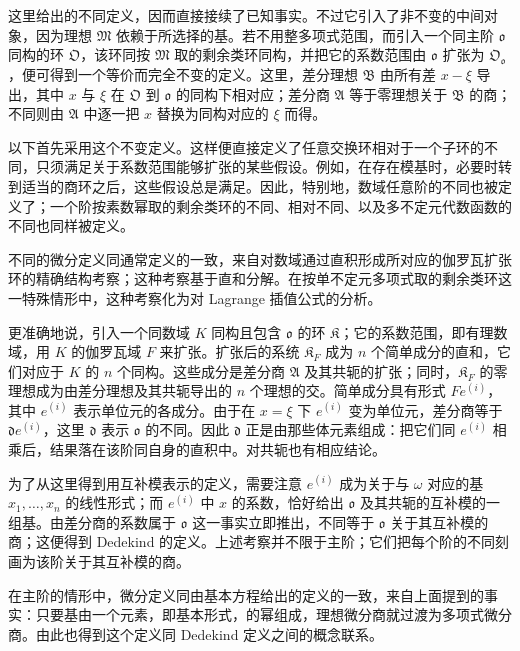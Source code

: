 这里给出的不同定义，因而直接接续了已知事实。不过它引入了非不变的中间对象，因为理想 \(\mathfrak M\) 依赖于所选择的基。若不用整多项式范围，而引入一个同主阶 \(\mathfrak o\) 同构的环 \(\mathfrak O\)，该环同按 \(\mathfrak M\) 取的剩余类环同构，并把它的系数范围由 \(\mathfrak o\) 扩张为 \(\mathfrak O_{\mathfrak o}\)，便可得到一个等价而完全不变的定义。这里，差分理想 \(\mathfrak B\) 由所有差 \(x-\xi\) 导出，其中 \(x\) 与 \(\xi\) 在 \(\mathfrak O\) 到 \(\mathfrak o\) 的同构下相对应；差分商 \(\mathfrak A\) 等于零理想关于 \(\mathfrak B\) 的商；不同则由 \(\mathfrak A\) 中逐一把 \(x\) 替换为同构对应的 \(\xi\) 而得。

以下首先采用这个不变定义。这样便直接定义了任意交换环相对于一个子环的不同，只须满足关于系数范围能够扩张的某些假设。例如，在存在模基时，必要时转到适当的商环之后，这些假设总是满足。因此，特别地，数域任意阶的不同也被定义了；一个阶按素数幂取的剩余类环的不同、相对不同、以及多不定元代数函数的不同也同样被定义。

不同的微分定义同通常定义的一致，来自对数域通过直积形成所对应的伽罗瓦扩张环的精确结构考察；这种考察基于直和分解。在按单不定元多项式取的剩余类环这一特殊情形中，这种考察化为对 Lagrange 插值公式的分析。

更准确地说，引入一个同数域 \(K\) 同构且包含 \(\mathfrak o\) 的环 \(\mathfrak K\)；它的系数范围，即有理数域，用 \(K\) 的伽罗瓦域 \(F\) 来扩张。扩张后的系统 \(\mathfrak K_F\) 成为 \(n\) 个简单成分的直和，它们对应于 \(K\) 的 \(n\) 个同构。这些成分是差分商 \(\mathfrak A\) 及其共轭的扩张；同时，\(\mathfrak K_F\) 的零理想成为由差分理想及其共轭导出的 \(n\) 个理想的交。简单成分具有形式 \(Fe^{(i)}\)，其中 \(e^{(i)}\) 表示单位元的各成分。由于在 \(x=\xi\) 下 \(e^{(i)}\) 变为单位元，差分商等于 \(\mathfrak d e^{(i)}\)，这里 \(\mathfrak d\) 表示 \(\mathfrak o\) 的不同。因此 \(\mathfrak d\) 正是由那些体元素组成：把它们同 \(e^{(i)}\) 相乘后，结果落在该阶同自身的直积中。对共轭也有相应结论。

为了从这里得到用互补模表示的定义，需要注意 \(e^{(i)}\) 成为关于与 \(\omega\) 对应的基 \(x_1,\ldots,x_n\) 的线性形式；而 \(e^{(i)}\) 中 \(x\) 的系数，恰好给出 \(\mathfrak o\) 及其共轭的互补模的一组基。由差分商的系数属于 \(\mathfrak o\) 这一事实立即推出，不同等于 \(\mathfrak o\) 关于其互补模的商；这便得到 Dedekind 的定义。上述考察并不限于主阶；它们把每个阶的不同刻画为该阶关于其互补模的商。

在主阶的情形中，微分定义同由基本方程给出的定义的一致，来自上面提到的事实：只要基由一个元素，即基本形式，的幂组成，理想微分商就过渡为多项式微分商。由此也得到这个定义同 Dedekind 定义之间的概念联系。

